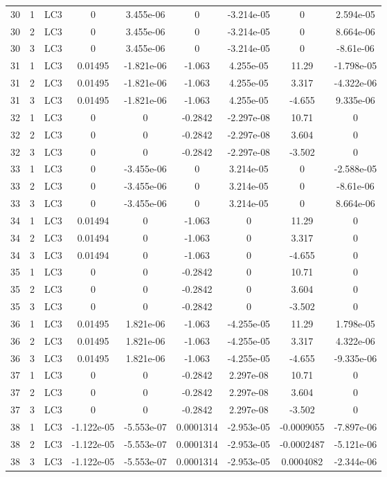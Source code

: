 \documentclass{article}%
\begin{document}
\begin{longtable}{| c c c | c c c c c c |}
30&1&LC3&0&3.455e{-}06&0&{-}3.214e{-}05&0&2.594e{-}05\\%
30&2&LC3&0&3.455e{-}06&0&{-}3.214e{-}05&0&8.664e{-}06\\%
30&3&LC3&0&3.455e{-}06&0&{-}3.214e{-}05&0&{-}8.61e{-}06\\%
31&1&LC3&0.01495&{-}1.821e{-}06&{-}1.063&4.255e{-}05&11.29&{-}1.798e{-}05\\%
31&2&LC3&0.01495&{-}1.821e{-}06&{-}1.063&4.255e{-}05&3.317&{-}4.322e{-}06\\%
31&3&LC3&0.01495&{-}1.821e{-}06&{-}1.063&4.255e{-}05&{-}4.655&9.335e{-}06\\%
32&1&LC3&0&0&{-}0.2842&{-}2.297e{-}08&10.71&0\\%
32&2&LC3&0&0&{-}0.2842&{-}2.297e{-}08&3.604&0\\%
32&3&LC3&0&0&{-}0.2842&{-}2.297e{-}08&{-}3.502&0\\%
33&1&LC3&0&{-}3.455e{-}06&0&3.214e{-}05&0&{-}2.588e{-}05\\%
33&2&LC3&0&{-}3.455e{-}06&0&3.214e{-}05&0&{-}8.61e{-}06\\%
33&3&LC3&0&{-}3.455e{-}06&0&3.214e{-}05&0&8.664e{-}06\\%
34&1&LC3&0.01494&0&{-}1.063&0&11.29&0\\%
34&2&LC3&0.01494&0&{-}1.063&0&3.317&0\\%
34&3&LC3&0.01494&0&{-}1.063&0&{-}4.655&0\\%
35&1&LC3&0&0&{-}0.2842&0&10.71&0\\%
35&2&LC3&0&0&{-}0.2842&0&3.604&0\\%
35&3&LC3&0&0&{-}0.2842&0&{-}3.502&0\\%
36&1&LC3&0.01495&1.821e{-}06&{-}1.063&{-}4.255e{-}05&11.29&1.798e{-}05\\%
36&2&LC3&0.01495&1.821e{-}06&{-}1.063&{-}4.255e{-}05&3.317&4.322e{-}06\\%
36&3&LC3&0.01495&1.821e{-}06&{-}1.063&{-}4.255e{-}05&{-}4.655&{-}9.335e{-}06\\%
37&1&LC3&0&0&{-}0.2842&2.297e{-}08&10.71&0\\%
37&2&LC3&0&0&{-}0.2842&2.297e{-}08&3.604&0\\%
37&3&LC3&0&0&{-}0.2842&2.297e{-}08&{-}3.502&0\\%
38&1&LC3&{-}1.122e{-}05&{-}5.553e{-}07&0.0001314&{-}2.953e{-}05&{-}0.0009055&{-}7.897e{-}06\\%
38&2&LC3&{-}1.122e{-}05&{-}5.553e{-}07&0.0001314&{-}2.953e{-}05&{-}0.0002487&{-}5.121e{-}06\\%
38&3&LC3&{-}1.122e{-}05&{-}5.553e{-}07&0.0001314&{-}2.953e{-}05&0.0004082&{-}2.344e{-}06\\%

\end{longtable}
\end{document}
